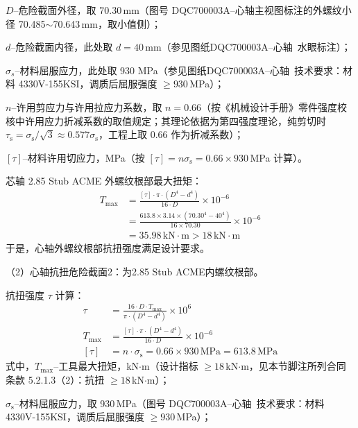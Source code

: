$D$--危险截面外径，取 70.30\,mm（图号 DQC700003A--心轴主视图标注的外螺纹小径 70.485$\sim$70.643\,mm，取小值侧）；

$d$--危险截面内径，此处取 $d = 40\,\text{mm}$（参见图纸DQC700003A--心轴\ 水眼标注）；

$\sigma_s$--材料屈服应力，此处取 930 MPa（参见图纸DQC700003A--心轴\ 技术要求：材料 4330V-155KSI，调质后屈服强度 $\ge 930$\,MPa）；

$n$--许用剪应力与许用拉应力系数，取 $n = 0.66$（按《机械设计手册》零件强度校核中许用应力折减系数的取值规定\cite{ref26}；其理论依据为第四强度理论，纯剪切时 $\tau_{\mathrm{s}} = \sigma_{\mathrm{s}}/\sqrt{3} \approx 0.577\sigma_{\mathrm{s}}$，工程上取 $0.66$ 作为折减系数）；

$[\tau]$--材料许用切应力，MPa（按 $[\tau]=n\sigma_{\mathrm{s}} = 0.66\times 930$\,MPa 计算）。

芯轴 2.85 Stub ACME 外螺纹根部最大扭矩：
\begin{equation}
    \begin{aligned}
        T_{\max} &= \frac{[\tau] \cdot \pi \cdot (D^4 - d^4)}{16 \cdot D} \times 10^{-6} \\
                &= \frac{613.8 \times 3.14 \times (70.30^4 - 40^4)}{16 \times 70.30} \times 10^{-6} \\
                &= 35.98\,\text{kN}\cdot\text{m} > 18\,\text{kN}\cdot\text{m}
    \end{aligned}
\end{equation}
于是，心轴外螺纹根部抗扭强度满足设计要求。

（2）心轴抗扭危险截面2：为2.85 Stub ACME内螺纹根部。

抗扭强度 $\tau$ 计算：
\begin{equation}
    \begin{aligned}
        \tau &= \frac{16 \cdot D \cdot T_{\max}}{\pi \cdot (D^4 - d^4)} \times 10^6 \\
        T_{\max} &= \frac{[\tau] \cdot \pi \cdot (D^4 - d^4)}{16 \cdot D} \times 10^{-6} \\
        [\tau] &= n \cdot \sigma_{\mathrm{s}} = 0.66 \times 930\,\text{MPa} = 613.8\,\text{MPa}
    \end{aligned}
\end{equation}
式中，$T_{\max}$--工具最大扭矩，kN$\cdot$m（设计指标 $\ge 18$\,kN$\cdot$m，见本节脚注所列合同条款 5.2.1.3（2）：抗扭 $\ge 18$\,kN$\cdot$m）；

$\sigma_{\mathrm{s}}$--材料屈服应力，取 930\,MPa（图号 DQC700003A--心轴\ 技术要求：材料 4330V-155KSI，调质后屈服强度 $\ge 930$\,MPa）；

